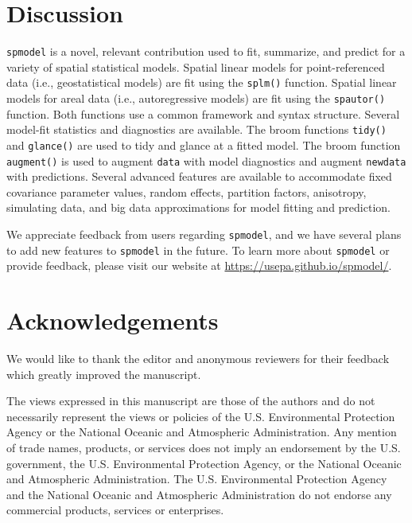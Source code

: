 \documentclass[10pt,letterpaper]{article}
\begin{document}
\hypertarget{sec:discussion}{%
\section{Discussion}\label{sec:discussion}}

\texttt{spmodel} is a novel, relevant contribution used to fit,
summarize, and predict for a variety of spatial statistical models.
Spatial linear models for point-referenced data (i.e., geostatistical
models) are fit using the \texttt{splm()} function. Spatial linear
models for areal data (i.e., autoregressive models) are fit using the
\texttt{spautor()} function. Both functions use a common framework and
syntax structure. Several model-fit statistics and diagnostics are
available. The broom functions \texttt{tidy()} and \texttt{glance()} are
used to tidy and glance at a fitted model. The broom function
\texttt{augment()} is used to augment \texttt{data} with model
diagnostics and augment \texttt{newdata} with predictions. Several
advanced features are available to accommodate fixed covariance
parameter values, random effects, partition factors, anisotropy,
simulating data, and big data approximations for model fitting and
prediction.

We appreciate feedback from users regarding \texttt{spmodel}, and we
have several plans to add new features to \texttt{spmodel} in the
future. To learn more about \texttt{spmodel} or provide feedback, please
visit our website at \url{https://usepa.github.io/spmodel/}.

\hypertarget{acknowledgements}{%
\section*{Acknowledgements}\label{acknowledgements}}

We would like to thank the editor and anonymous reviewers for their
feedback which greatly improved the manuscript.

The views expressed in this manuscript are those of the authors and do
not necessarily represent the views or policies of the U.S.
Environmental Protection Agency or the National Oceanic and Atmospheric
Administration. Any mention of trade names, products, or services does
not imply an endorsement by the U.S. government, the U.S. Environmental
Protection Agency, or the National Oceanic and Atmospheric
Administration. The U.S. Environmental Protection Agency and the
National Oceanic and Atmospheric Administration do not endorse any
commercial products, services or enterprises.
\end{document}
